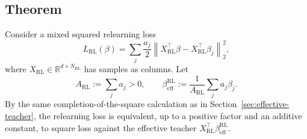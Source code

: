 \documentclass[11pt]{article}
\begin{document}
\subsection{Theorem}

Consider a mixed squared relearning loss
\begin{equation}
    L_{\mathrm{RL}}(\beta)
    =
    \sum_j
    \frac{a_j}{2}
    \left\|
    X_{\mathrm{RL}}^\top\beta
    -
    X_{\mathrm{RL}}^\top\beta_j
    \right\|_2^2,
\end{equation}
where \(X_{\mathrm{RL}}\in\mathbb{R}^{d\times N_{\mathrm{RL}}}\) has samples as columns. Let
\begin{equation}
    A_{\mathrm{RL}}:=\sum_j a_j>0,
    \qquad
    \beta_{\mathrm{eff}}^{\mathrm{RL}}
    :=
    \frac{1}{A_{\mathrm{RL}}}\sum_j a_j\beta_j.
\end{equation}
By the same completion-of-the-square calculation as in Section~\ref{sec:effective-teacher}, the relearning loss is equivalent, up to a positive factor and an additive constant, to square loss against the effective teacher \(X_{\mathrm{RL}}^\top\beta_{\mathrm{eff}}^{\mathrm{RL}}\).
\end{document}
